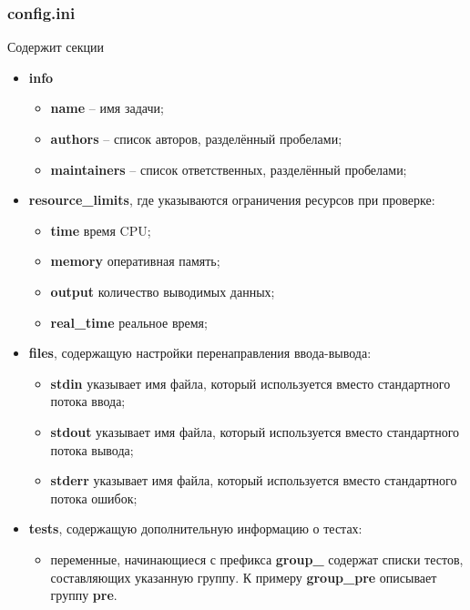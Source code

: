 \subsubsection{config.ini}
Содержит секции
\begin{itemize}
    \item \textbf{info}
        \begin{itemize}
            \item \textbf{name} -- имя задачи;
            \item \textbf{authors} -- список авторов, разделённый пробелами;
            \item \textbf{maintainers} -- список ответственных, разделённый пробелами;
        \end{itemize}
    \item \textbf{resource\_limits}, где указываются ограничения ресурсов при проверке:
        \begin{itemize}
            \item \textbf{time} время CPU;
            \item \textbf{memory} оперативная память;
            \item \textbf{output} количество выводимых данных;
            \item \textbf{real\_time} реальное время;
        \end{itemize}
    \item \textbf{files}, содержащую настройки перенаправления ввода-вывода:
        \begin{itemize}
            \item \textbf{stdin} указывает имя файла,
                который используется вместо стандартного потока ввода;
            \item \textbf{stdout} указывает имя файла,
                который используется вместо стандартного потока вывода;
            \item \textbf{stderr} указывает имя файла,
                который используется вместо стандартного потока ошибок;
        \end{itemize}
    \item \textbf{tests}, содержащую дополнительную информацию о тестах:
        \begin{itemize}
            \item переменные, начинающиеся с префикса \textbf{group\_}
                содержат списки тестов, составляющих указанную группу.
                К примеру \textbf{group\_pre} описывает группу \textbf{pre}.
        \end{itemize}
\end{itemize}

